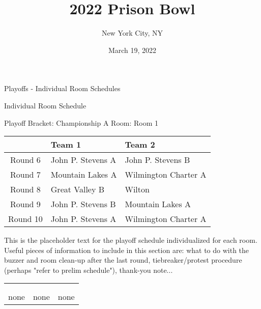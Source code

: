 \documentclass{article}%
\title{2022 Prison Bowl}%
\author{New York City, NY}%
\date{March 19, 2022}%
\begin{document}
%
\normalsize%
%
\maketitle%
\vspace*{48pt}%
\begin{center}%
\begin{Huge}%
Playoffs {-} Individual Room Schedules%
\end{Huge}%
\end{center}%
\newpage%
\pagestyle{fancy}%
\fancyhf{}%
%
%
%
\begin{center}%
\begin{Huge}%
Individual Room Schedule%
\end{Huge}%
\vspace*{16pt}%
\linebreak%
\begin{Large}%
Playoff Bracket: Championship A \hfill Room: Room 1%
\end{Large}%
\end{center}%
%
\begin{tabularx}{\textwidth}{|c|Y|Y|}%
\hline%
&Team 1&Team 2\\%
\hline%
Round 6&John P. Stevens A&John P. Stevens B\\%
Round 7&Mountain Lakes A&Wilmington Charter A\\%
Round 8&Great Valley B&Wilton\\%
Round 9&John P. Stevens B&Mountain Lakes A\\%
Round 10&John P. Stevens A&Wilmington Charter A\\%
\hline%
\end{tabularx}%
\vspace*{16pt}%
\linebreak%
This is the placeholder text for the playoff schedule individualized for each room. Useful pieces of information to include in this section are: what to do with the buzzer and room clean{-}up after the last round, tiebreaker/protest procedure (perhaps "refer to prelim schedule"), thank{-}you note...%
\vspace*{30pt}%
\newline%
%
\begin{tabularx}{\textwidth}{YYY}%
  &  &  \\%
\\%
none&none&none\\%
\end{tabularx}%
\end{document}
